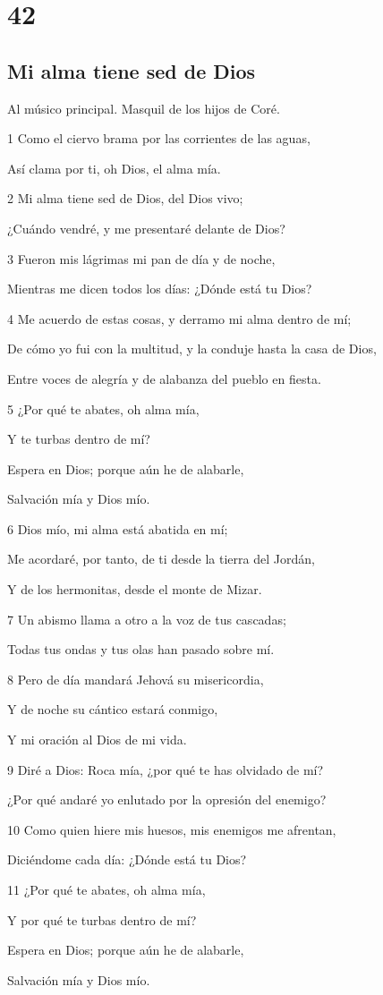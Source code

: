 \chapter{42}

\section*{Mi alma tiene sed de Dios}

\par Al músico principal. Masquil de los hijos de Coré.

\par 1 Como el ciervo brama por las corrientes de las aguas,
\par Así clama por ti, oh Dios, el alma mía.
\par 2 Mi alma tiene sed de Dios, del Dios vivo;
\par ¿Cuándo vendré, y me presentaré delante de Dios?
\par 3 Fueron mis lágrimas mi pan de día y de noche,
\par Mientras me dicen todos los días: ¿Dónde está tu Dios?
\par 4 Me acuerdo de estas cosas, y derramo mi alma dentro de mí;
\par De cómo yo fui con la multitud, y la conduje hasta la casa de Dios,
\par Entre voces de alegría y de alabanza del pueblo en fiesta.
\par 5 ¿Por qué te abates, oh alma mía,
\par Y te turbas dentro de mí?
\par Espera en Dios; porque aún he de alabarle,
\par Salvación mía y Dios mío.
\par 6 Dios mío, mi alma está abatida en mí;
\par Me acordaré, por tanto, de ti desde la tierra del Jordán,
\par Y de los hermonitas, desde el monte de Mizar.
\par 7 Un abismo llama a otro a la voz de tus cascadas;
\par Todas tus ondas y tus olas han pasado sobre mí.
\par 8 Pero de día mandará Jehová su misericordia,
\par Y de noche su cántico estará conmigo,
\par Y mi oración al Dios de mi vida.
\par 9 Diré a Dios: Roca mía, ¿por qué te has olvidado de mí?
\par ¿Por qué andaré yo enlutado por la opresión del enemigo?
\par 10 Como quien hiere mis huesos, mis enemigos me afrentan,
\par Diciéndome cada día: ¿Dónde está tu Dios?
\par 11 ¿Por qué te abates, oh alma mía,
\par Y por qué te turbas dentro de mí?
\par Espera en Dios; porque aún he de alabarle,
\par Salvación mía y Dios mío.

